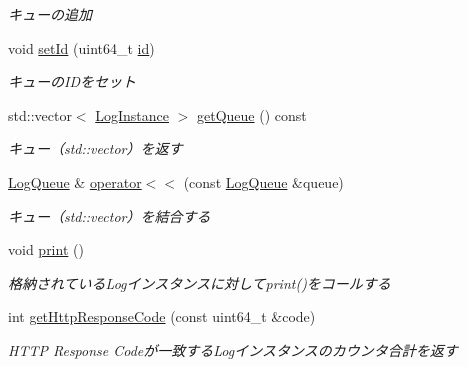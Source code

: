 \begin{DoxyCompactItemize}
\begin{DoxyCompactList}\small\item\em キューの追加 \end{DoxyCompactList}\item 
void \mbox{\hyperlink{class_g_a_1_1_log_queue_ab58dec28bf80d687c364ab54f84ebb36}{set\+Id}} (uint64\+\_\+t \mbox{\hyperlink{class_g_a_1_1_log_queue_a57f6f3271f69897a0e7e0f0fe93b2f0c}{id}})
\begin{DoxyCompactList}\small\item\em キューの\+I\+Dをセット \end{DoxyCompactList}\item 
\mbox{\label{class_g_a_1_1_log_queue_a3091d352fa55c1f0e9ed1b27845628d2}} 
std\+::vector$<$ \mbox{\hyperlink{class_g_a_1_1_log_instance}{Log\+Instance}} $>$ \mbox{\hyperlink{class_g_a_1_1_log_queue_a3091d352fa55c1f0e9ed1b27845628d2}{get\+Queue}} () const
\begin{DoxyCompactList}\small\item\em キュー（std\+::vector）を返す \end{DoxyCompactList}\item 
\mbox{\hyperlink{class_g_a_1_1_log_queue}{Log\+Queue}} \& \mbox{\hyperlink{class_g_a_1_1_log_queue_ad48e5dce58ea14ef6f40eb27fd1d6e95}{operator$<$$<$}} (const \mbox{\hyperlink{class_g_a_1_1_log_queue}{Log\+Queue}} \&queue)
\begin{DoxyCompactList}\small\item\em キュー（std\+::vector）を結合する \end{DoxyCompactList}\item 
\mbox{\label{class_g_a_1_1_log_queue_a68e679bbf9e0b4589a7192b7b7f26d17}} 
void \mbox{\hyperlink{class_g_a_1_1_log_queue_a68e679bbf9e0b4589a7192b7b7f26d17}{print}} ()
\begin{DoxyCompactList}\small\item\em 格納されている\+Logインスタンスに対してprint()をコールする \end{DoxyCompactList}\item 
int \mbox{\hyperlink{class_g_a_1_1_log_queue_ad2026bee29a87a03824227189cf13fa3}{get\+Http\+Response\+Code}} (const uint64\+\_\+t \&code)
\begin{DoxyCompactList}\small\item\em H\+T\+TP Response Codeが一致する\+Logインスタンスのカウンタ合計を返す \end{DoxyCompactList}\item 

\end{DoxyCompactItemize}
